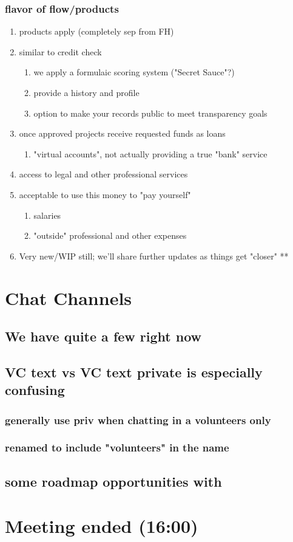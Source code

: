 \documentclass[11pt]{article}
\begin{document}
\subsubsection{flavor of flow/products}
\label{sec:org37bbf22}
\begin{enumerate}
\item products apply (completely sep from FH)
\label{sec:orgf322caa}
\item similar to credit check
\label{sec:org4f5fb4c}
\begin{enumerate}
\item we apply a formulaic scoring system ("Secret Sauce"?)
\label{sec:orgf012cd7}
\item provide a history and profile
\label{sec:orga4959bf}
\item option to make your records public to meet transparency goals
\label{sec:orgec438b0}
\end{enumerate}
\item once approved projects receive requested funds as loans
\label{sec:org2fc5ba4}
\begin{enumerate}
\item "virtual accounts", not actually providing a true "bank" service
\label{sec:orgb90c44b}
\end{enumerate}
\item access to legal and other professional services
\label{sec:org084d1b5}
\item acceptable to use this money to "pay yourself"
\label{sec:org7a6eefe}
\begin{enumerate}
\item salaries
\label{sec:org6529920}
\item "outside" professional and other expenses
\label{sec:orgc3c88e7}
\end{enumerate}
\item Very new/WIP still; we'll share further updates as things get "closer"
\label{sec:orgbeccf3b}
**
\end{enumerate}
\section{Chat Channels}
\label{sec:orgbca646e}
\subsection{We have quite a few right now}
\label{sec:org74ab0f9}
\subsection{VC text vs VC text private is especially confusing}
\label{sec:orge426c9f}
\subsubsection{generally use priv when chatting in a volunteers only}
\label{sec:orge3cf142}
\subsubsection{renamed to include "volunteers" in the name}
\label{sec:orgabc7052}
\subsection{some roadmap opportunities with}
\label{sec:org6c0ba30}
\section{Meeting ended (16:00)}
\label{sec:orgb26a5c5}
\end{document}
